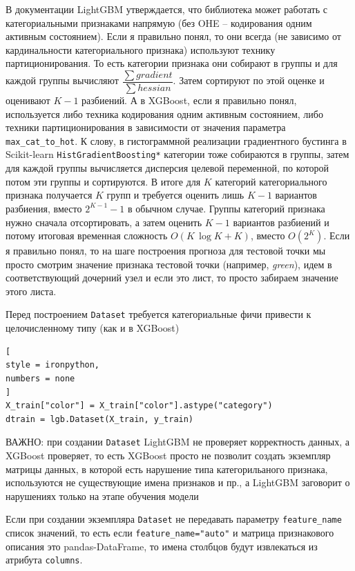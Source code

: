 \documentclass[%
	11pt,
	a4paper,
	utf8,
		]{article}
\begin{document}
В документации LightGBM утверждается, что библиотека может работать с категориальными признаками напрямую (без OHE -- кодирования одним активным состоянием). Если я правильно понял, то они всегда (не зависимо от кардинальности категориального признака) используют технику партиционирования. То есть категории признака они собирают в группы и для каждой группы вычисляют $ \dfrac{ \sum gradient }{ \sum hessian } $. Затем сортируют по этой оценке и оценивают $ K - 1 $ разбиений. А в XGBoost, если я правильно понял, используется либо техника кодирования одним активным состоянием, либо техники партиционирования в зависимости от значения параметра \verb|max_cat_to_hot|. К слову, в гистограммной реализации градиентного бустинга в Scikit-learn \verb|HistGradientBoosting*| категории тоже собираются в группы, затем для каждой группы вычисляется дисперсия целевой переменной, по которой потом эти группы и сортируются. В итоге для $ K $ категорий категориального признака получается $ K $ групп и требуется оценить лишь $ K - 1 $ вариантов разбиения, вместо $ 2^{K - 1} - 1 $ в обычном случае. Группы категорий признака нужно сначала отсортировать, а затем оценить $ K - 1 $ вариантов разбиений и потому итоговая временная сложность $ O(K \, \log K + K) $, вместо $ O(2^K) $. Если я правильно понял, то на шаге построения прогноза для тестовой точки мы просто смотрим значение признака тестовой точки (например, \emph{green}), идем в соответствующий дочерний узел и если это лист, то просто забираем значение этого листа.

Перед построением \verb|Dataset| требуется категориальные фичи привести к целочисленному типу (как и в XGBoost)
\begin{lstlisting}[
style = ironpython,
numbers = none
]
X_train["color"] = X_train["color"].astype("category")
dtrain = lgb.Dataset(X_train, y_train)
\end{lstlisting}

{\color{red}ВАЖНО: при создании \verb|Dataset| LightGBM не проверяет корректность данных, а XGBoost проверяет, то есть XGBoost просто не позволит создать экземпляр матрицы данных, в которой есть нарушение типа категорильаного признака, используются не существующие имена признаков и пр., а LightGBM заговорит о нарушениях только на этапе обучения модели}

Если при создании экземпляра \verb|Dataset| не передавать параметру \verb|feature_name| список значений, то есть если \verb|feature_name="auto"| и матрица признакового описания это pandas-DataFrame, то имена столбцов будут извлекаться из атрибута \verb|columns|. 
\end{document}
